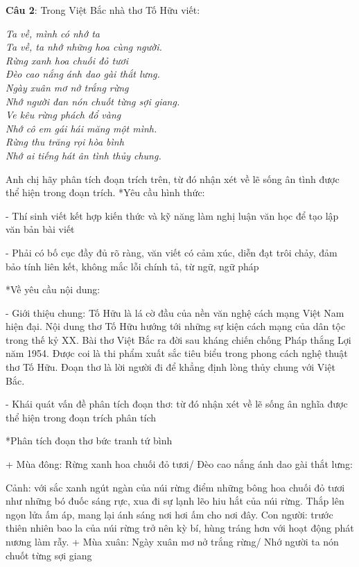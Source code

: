 \documentclass{article}
\begin{document}
{	
	\begin{mdframed}[linewidth=1pt,linecolor=red]	
		\textbf{Câu 2}: Trong Việt Bắc nhà thơ Tố Hữu viết:
\begin{multicols}{2}
\emph{
				Ta về, mình có nhớ ta \\
				Ta về, ta nhớ những hoa cùng người. \\
				Rừng xanh hoa chuối đỏ tươi \\
				Đèo cao nắng ánh dao gài thắt lưng. \\
				Ngày xuân mơ nở trắng rừng \\
				Nhớ người đan nón chuốt từng sợi giang. \\
				Ve kêu rừng phách đổ vàng \\
				Nhớ cô em gái hái măng một mình. \\
				Rừng thu trăng rọi hòa bình \\
				Nhớ ai tiếng hát ân tình thủy chung. \\
			}
\end{multicols}
Anh chị hãy phân tích đoạn trích trên, từ đó nhận xét về lẽ sống ân tình được thể hiện trong đoạn trích.
		*Yêu cầu hình thức:
		
		- Thí sinh viết kết hợp kiến thức và kỹ năng làm nghị luận văn học để tạo lập văn bản bài viết
		
		- Phải có bố cục đầy đủ rõ ràng, văn viết có cảm xúc, diễn đạt trôi chảy, đảm bảo tính liên kết, không mắc lỗi chính tả, từ ngữ, ngữ pháp
		
		*Về yêu cầu nội dung:
		
		- Giới thiệu chung: Tố Hữu là lá cờ đầu của nền văn nghệ cách mạng Việt Nam hiện đại. Nội dung thơ Tố Hữu hướng tới những sự kiện cách mạng của dân tộc trong thế kỷ XX. Bài thơ Việt Bắc ra đời sau kháng chiến chống Pháp thắng Lợi năm 1954. Được coi là thi phẩm xuất sắc tiêu biểu trong phong cách nghệ thuật thơ Tố Hữu. Đoạn thơ là lời người đi để khẳng định lòng thủy chung với Việt Bắc.
		
		- Khái quát vấn đề phân tích đoạn thơ: từ đó nhận xét về lẽ sống ân nghĩa được thể hiện trong đoạn trích phân tích
		
		*Phân tích đoạn thơ bức tranh tứ bình
		
		+ Mùa đông: Rừng xanh hoa chuối đỏ tươi/ Đèo cao nắng ánh dao gài thắt lưng:
		
		Cảnh: với sắc xanh ngút ngàn của núi rừng điểm những bông hoa chuối đỏ tươi như những bó đuốc sáng rực, xua đi sự lạnh lẽo hiu hắt của núi rừng. Thắp lên ngọn lửa ấm áp, mang lại ánh sáng nơi hơi ấm cho nơi đây.
		Con người: trước thiên nhiên bao la của núi rừng trở nên kỳ bí, hùng tráng hơn với hoạt động phát nương làm rẫy.
		+ Mùa xuân: Ngày xuân mơ nở trắng rừng/ Nhớ người ta nón chuốt từng sợi giang
		

\end{mdframed}}
\end{document}
